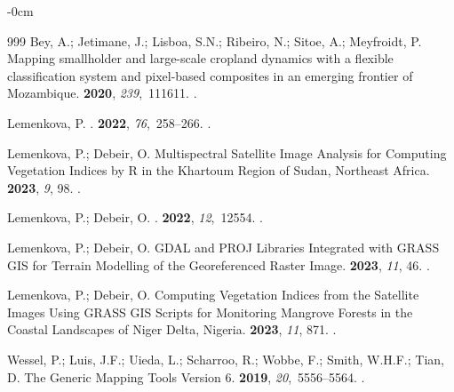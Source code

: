 \documentclass[coasts,article,accept,pdftex,oneauthor]{Definitions/mdpi}
\begin{document}
\begin{adjustwidth}{-\extralength}{0cm}
\begin{thebibliography}{999}
Bey, A.; Jetimane, J.; Lisboa, S.N.; Ribeiro, N.; Sitoe, A.; Meyfroidt, P.
\newblock Mapping smallholder and large-scale cropland dynamics with a flexible
  classification system and pixel-based composites in an emerging frontier of
  Mozambique.
 {\bf 2020}, {\em 239},~111611.
.

Lemenkova, P.
.
 {\bf 2022}, {\em 76},~258--266.
.

Lemenkova, P.; Debeir, O.
\newblock Multispectral Satellite Image Analysis for Computing Vegetation
  Indices by R in the Khartoum Region of Sudan, Northeast Africa.
 {\bf 2023}, {\em 9}, 98.
.

Lemenkova, P.; Debeir, O.
.
 {\bf 2022}, {\em 12},~12554.
.

Lemenkova, P.; Debeir, O.
\newblock GDAL and PROJ Libraries Integrated with GRASS GIS for Terrain
  Modelling of the Georeferenced Raster Image.
 {\bf 2023}, {\em 11}, 46.
.

Lemenkova, P.; Debeir, O.
\newblock Computing Vegetation Indices from the Satellite Images Using GRASS
  GIS Scripts for Monitoring Mangrove Forests in the Coastal Landscapes of
  Niger Delta, Nigeria.
 {\bf 2023}, {\em 11}, 871.
.

Wessel, P.; Luis, J.F.; Uieda, L.; Scharroo, R.; Wobbe, F.; Smith, W.H.F.;
  Tian, D.
\newblock The Generic Mapping Tools Version 6.
 {\bf 2019}, {\em
  20},~5556--5564.
.


\end{thebibliography}
\end{adjustwidth}
\end{document}
